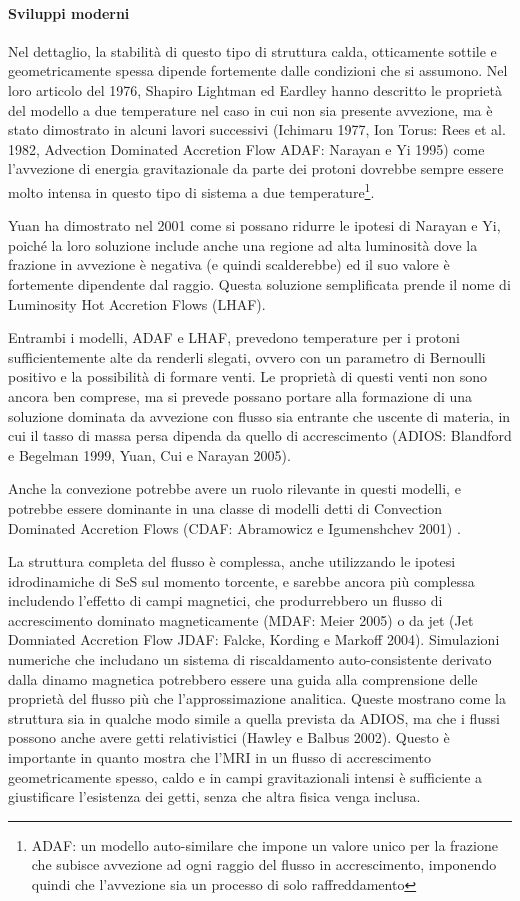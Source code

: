 \documentclass[a4paperbi]{article}
\begin{document}
	\paragraph{Sviluppi moderni}
	
	Nel dettaglio, la stabilità di questo tipo di struttura calda, otticamente sottile e geometricamente spessa dipende fortemente dalle condizioni che si assumono. Nel loro articolo del 1976, Shapiro Lightman ed Eardley hanno descritto le proprietà del modello a due temperature nel caso in cui non sia presente avvezione, ma è stato dimostrato in alcuni lavori successivi (Ichimaru 1977, Ion Torus: Rees et al. 1982, Advection Dominated Accretion Flow ADAF: Narayan e Yi 1995) come l'avvezione di energia gravitazionale da parte dei protoni dovrebbe sempre essere molto intensa in questo tipo di sistema a due temperature\footnote{ADAF: un modello auto-similare che impone un valore unico per la frazione che subisce avvezione ad ogni raggio del flusso in accrescimento, imponendo quindi che l'avvezione sia un processo di solo raffreddamento}.
	
	Yuan ha dimostrato nel 2001 come si possano ridurre le ipotesi di Narayan e Yi, poiché la loro soluzione include anche una regione ad alta luminosità dove la frazione in avvezione è negativa (e quindi scalderebbe) ed il suo valore è fortemente dipendente dal raggio. Questa soluzione semplificata prende il nome di Luminosity Hot Accretion Flows (LHAF).
	
	Entrambi i modelli, ADAF e LHAF, prevedono temperature per i protoni sufficientemente alte da renderli slegati, ovvero con un parametro di Bernoulli positivo e la possibilità di formare venti. Le proprietà di questi venti non sono ancora ben comprese, ma si prevede possano portare alla formazione di una soluzione dominata da avvezione con flusso sia entrante che uscente di materia, in cui il tasso di massa persa dipenda da quello di accrescimento (ADIOS: Blandford e Begelman 1999, Yuan, Cui e Narayan 2005). 
	
	Anche la convezione potrebbe avere un ruolo rilevante in questi modelli, e potrebbe essere dominante in una classe di modelli detti di Convection Dominated Accretion Flows (CDAF: Abramowicz e Igumenshchev 2001) .
	
	La struttura completa del flusso è complessa, anche utilizzando le ipotesi idrodinamiche di SeS sul momento torcente, e sarebbe ancora più complessa includendo l'effetto di campi magnetici, che produrrebbero un flusso di accrescimento dominato magneticamente (MDAF: Meier 2005) o da jet (Jet Domniated Accretion Flow JDAF: Falcke, Kording e Markoff 2004). Simulazioni numeriche che includano un sistema di riscaldamento auto-consistente derivato dalla dinamo magnetica potrebbero essere una guida alla comprensione delle proprietà del flusso più che l'approssimazione analitica. Queste mostrano come la struttura sia in qualche modo simile a quella prevista da ADIOS, ma che i flussi possono anche avere getti relativistici (Hawley e Balbus 2002). Questo è importante in quanto mostra che l'MRI in un flusso di accrescimento geometricamente spesso, caldo e in campi gravitazionali intensi è sufficiente a giustificare l'esistenza dei getti, senza che altra fisica venga inclusa.
	
\end{document}
